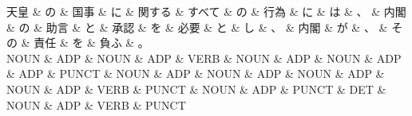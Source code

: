 \documentclass[tikz,border=5pt]{standalone}
\begin{document}
\normalsize
\begin{dependency}[edge unit distance=12.0pt]
    \begin{deptext}[column sep=1em]
        天皇 \& の \& 国事 \& に \& 関する \& すべて \& の \& 行為 \& に \& は \& 、 \& 内閣 \& の \& 助言 \& と \& 承認 \& を \& 必要 \& と \& し \& 、 \& 内閣 \& が \& 、 \& その \& 責任 \& を \& 負ふ \& 。\\
        NOUN \& ADP \& NOUN \& ADP \& VERB \& NOUN \& ADP \& NOUN \& ADP \& ADP \& PUNCT \& NOUN \& ADP \& NOUN \& ADP \& NOUN \& ADP \& NOUN \& ADP \& VERB \& PUNCT \& NOUN \& ADP \& PUNCT \& DET \& NOUN \& ADP \& VERB \& PUNCT\\
    \end{deptext}
\end{dependency}
\end{document}
